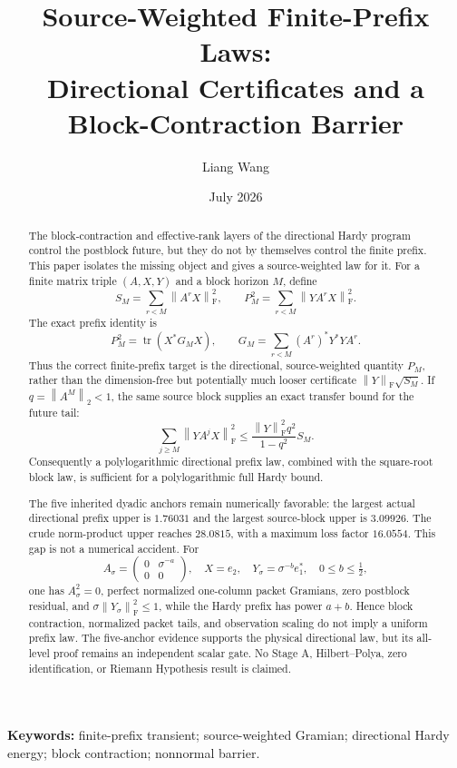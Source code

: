 \documentclass[11pt]{article}
\title{Source-Weighted Finite-Prefix Laws:\\
\large Directional Certificates and a Block-Contraction Barrier}
\author{Liang Wang}
\date{July 2026}
\theoremstyle{definition}
\theoremstyle{remark}
\newcommand{\norm}[1]{\left\lVert#1\right\rVert}
\newcommand{\F}{\mathrm F}
\newcommand{\tr}{\operatorname{tr}}
\begin{document}
\maketitle

\begin{abstract}
The block-contraction and effective-rank layers of the directional Hardy
program control the postblock future, but they do not by themselves control
the finite prefix.  This paper isolates the missing object and gives a
source-weighted law for it.  For a finite matrix triple $(A,X,Y)$ and a block
horizon $M$, define
\[
 S_M=\sum_{r<M}\norm{A^rX}_{\F}^2,
 \qquad
 P_M^2=\sum_{r<M}\norm{YA^rX}_{\F}^2.
\]
The exact prefix identity is
\[
 P_M^2=\tr(X^*G_MX),
 \qquad
 G_M=\sum_{r<M}(A^r)^*Y^*YA^r.
\]
Thus the correct finite-prefix target is the directional, source-weighted
quantity $P_M$, rather than the dimension-free but potentially much looser
certificate $\norm{Y}_{\F}\sqrt{S_M}$.  If $q=\norm{A^M}_2<1$, the same source
block supplies an exact transfer bound for the future tail:
\[
 \sum_{j\ge M}\norm{YA^jX}_{\F}^2
 \le \frac{\norm{Y}_{\F}^2q^2}{1-q^2}S_M.
\]
Consequently a polylogarithmic directional prefix law, combined with the
square-root block law, is sufficient for a polylogarithmic full Hardy bound.

The five inherited dyadic anchors remain numerically favorable: the largest
actual directional prefix upper is $1.76031$ and the largest source-block
upper is $3.09926$.  The crude norm-product upper reaches $28.0815$, with a
maximum loss factor $16.0554$.  This gap is not a numerical accident.  For
\[
 A_\sigma=\begin{pmatrix}0&\sigma^{-a}\\0&0\end{pmatrix},\quad
 X=e_2,\quad Y_\sigma=\sigma^{-b}e_1^*,\quad 0\le b\le\tfrac12,
\]
one has $A_\sigma^2=0$, perfect normalized one-column packet Gramians, zero
postblock residual, and $\sigma\norm{Y_\sigma}_{\F}^2\le1$, while the Hardy
prefix has power $a+b$.  Hence block contraction, normalized packet tails,
and observation scaling do not imply a uniform prefix law.  The five-anchor
evidence supports the physical directional law, but its all-level proof
remains an independent scalar gate.  No Stage A, Hilbert--Polya, zero
identification, or Riemann Hypothesis result is claimed.
\end{abstract}

\noindent\textbf{Keywords:} finite-prefix transient; source-weighted Gramian;
directional Hardy energy; block contraction; nonnormal barrier.
\end{document}
